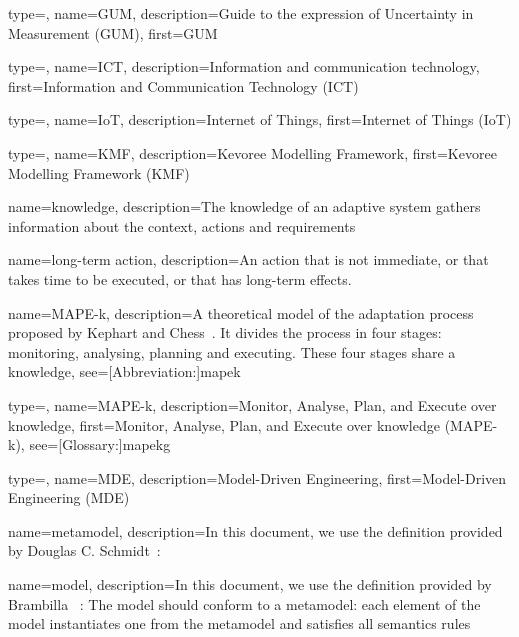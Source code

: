 {
	type=\acronymtype,
	name={GUM},
	description={Guide to the expression of Uncertainty in Measurement (GUM)},
	first={GUM}
}

{
	type=\acronymtype,
	name={ICT},
	description={Information and communication technology},
	first={Information and Communication Technology (ICT)}
}

{
	type=\acronymtype,
	name={IoT},
	description={Internet of Things},
	first={Internet of Things (IoT)}
}

{
	type=\acronymtype,
	name={KMF},
	description={Kevoree Modelling Framework},
	first={Kevoree Modelling Framework (KMF)}
}

{
	name={knowl\-ed\-ge},
	description={The knowledge of an adaptive system gathers information about the \gls{context}, \glspl{action} and \glspl{requirement}}
}

{
	name={long-term action},
	description={An \gls{action} that is not immediate, or that takes time to be executed, or that has long-term effects.}
}

{
	name={MAPE-k},
    description={A theoretical model of the adaptation process proposed by Kephart and Chess~\cite{DBLP:journals/computer/KephartC03}. It divides the process in four stages: monitoring, analysing, planning and executing. These four stages share a \gls{knowledge}},
    see=[Abbreviation:]{mapek}
}

{
	type=\acronymtype, 
	name={MAPE-k}, 
	description={Monitor, Analyse, Plan, and Execute over knowledge}, 
	first={Monitor, Analyse, Plan, and Execute over knowledge (MAPE-k)}, 
	see=[Glossary:]{mapekg}
}

{
	type=\acronymtype, 
	name={MDE},
	description={Model-Driven Engineering},
	first={Model-Driven Engineering (MDE)}
}

{
	name={meta\-model},
	description={In this document, we use the definition provided by Douglas C. \linebreak Schmidt~\cite{DBLP:journals/computer/Schmidt06}: }
}

{
	name={model},
	description={In this document, we use the definition provided by Brambilla \etal~\cite{DBLP:series/synthesis/2017Brambilla}:  The model should conform to a \gls{metamodel}: each element of the model instantiates one from the \gls{metamodel} and satisfies all semantics rules~\cite{DBLP:conf/iceccs/BezivinJT05}}
}

